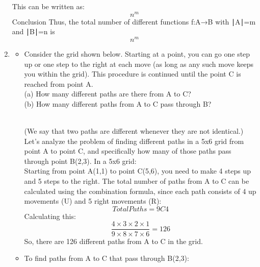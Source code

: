 \documentclass{book}
\begin{document}
\begin{enumerate}
	      This can be written as:
	      \[
		      n^m
	      \]
	      Conclusion
	      Thus, the total number of different functions
	      f:A→B with
	      ∣A∣=m and
	      ∣B∣=n is
	      \[
		      n^m
	      \]
	\item
	      \begin{itemize}
		      \item  Consider the grid shown below. Starting at a point, you can
		            go one step up or one step to the right at each move (as long
		            as any such move keeps you within the grid). This procedure
		            is continued until the point C is reached from point A.\\
		            (a) How many different paths are there from A to C?\\
		            (b) How many different paths from A to C pass through B?\\
		            \\
		            (We say that two paths are different whenever they are not
		            identical.)\\

		            Let's analyze the problem of finding different paths in a 5x6 grid from point A to point C, and specifically how many of those paths pass through point B(2,3).
		            In a 5x6 grid:\\
		            Starting from point A(1,1) to point C(5,6), you need to make 4 steps up and 5 steps to the right.
		            The total number of paths from A to C can be calculated using the combination formula, since each path consists of 4 up movements (U) and 5 right movements (R):
		            \[
			            Total Paths = 9C4
		            \]
		            Calculating this:
		            \[
			            \frac{4×3×2×1}{9×8×7×6} =126
		            \]
		            So, there are 126 different paths from A to C in the grid.
		      \item
		            To find paths from A to C that pass through B(2,3):


\end{itemize}
\end{enumerate}
\end{document}
